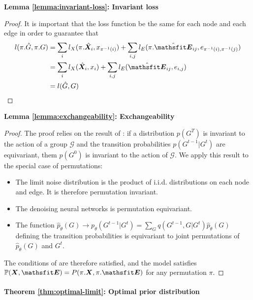 \documentclass{article} %
\theoremstyle{plain}
\theoremstyle{definition}
\theoremstyle{remark}
\begin{document}
\textbf{Lemma \ref{lemma:invariant-loss}: Invariant loss}\vspace{-0.2cm}
\begin{proof}
It is important that the loss function be the same for each node and each edge in order to guarantee that
\begin{align*}
l(\pi . \hat G, \pi . G) &= \sum_{i} l_X(\pi . \hat \mX_i,  x_{\pi^{-1}(i)}) + \sum_{i, j} l_E(\pi . \hat \tE_{ij}, e_{\pi^{-1}(i), \pi^{-1}(j)}) \\
&= \sum_i l_X(\hat \mX_i,  x_{i}) + \sum_{i, j} l_E(\hat \tE_{ij}, e_{i, j}) \\ 
&= l(\hat G, G) 
\end{align*}\end{proof}
\vspace{-0.5cm}
\textbf{Lemma \ref{lemma:exchangeability}: Exchangeability}\vspace{-0.2cm}
\begin{proof}
The proof relies on the result of \citet{xu2022geodiff}: if a distribution $p(G^T)$ is invariant to the action of a group $\mathcal G$ and the transition probabilities $p(G^{t-1} | G^t)$ are equivariant, them $p(G^0)$ is invariant to the action of $\mathcal G$. We apply this result to the special case of permutations:

\begin{itemize}[noitemsep, nolistsep]
    \item The limit noise distribution is the product of i.i.d. distributions on each node and edge. It is therefore permutation invariant.
    \item The denoising neural networks is permutation equivariant.
    \item The function $\hat p_\theta(G) \to p_\theta(G^{t-1} | G^t) = \sum_G q(G^{t-1}, G | G^t) \hat p_\theta(G)$ defining the transition probabilities is equivariant to joint permutations of $\hat p_\theta(G)$ and $G^t$.
\end{itemize}
The conditions of \citep{xu2022geodiff} are therefore satisfied, and the model satisfies $\mathbb P(\mX, \tE) = P(\pi . \mX, \pi . \tE )$ for any permutation $\pi$.
\end{proof}

\paragraph{Theorem \ref{thm:optimal-limit}: Optimal prior distribution}
\end{document}
